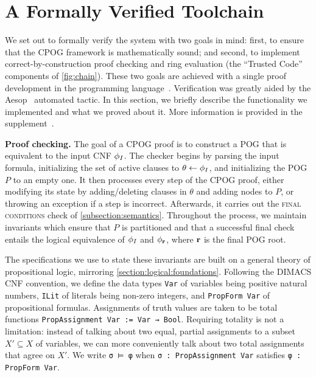 \section{A Formally Verified Toolchain}
\label{section:formally-verified-toolchain}

We set out to formally verify the system with two goals in mind: first, to ensure that the CPOG framework is mathematically
sound; and second, to implement correct-by-construction proof checking and ring evaluation (the ``Trusted Code'' components of \cref{fig:chain}). These two goals are achieved with a single proof development in the \lean{} programming language~\cite{demoura:cade:2021}. Verification was greatly aided by the Aesop~\cite{23limperg_aesop_white_box_best_first_proof_search_lean} automated tactic. In this section, we briefly describe the functionality we implemented and what we proved about it. More information is provided in the supplement~\cite{bryant:sat:2023:supplement}.

\vspace{1em}\noindent
\textbf{Proof checking.} The goal of a CPOG proof is to construct a POG that is equivalent to the input CNF $\phi_I$. The checker begins by parsing the input formula, initializing the set of active clauses to $\theta \leftarrow \phi_I$, and initializing the POG $P$ to an empty one. It then processes every step of the CPOG proof, either modifying its state by adding/deleting clauses in $\theta$ and adding nodes to $P$, or throwing an exception if a step is incorrect. Afterwards, it carries out the \textsc{final conditions} check of \cref{subsection:semantics}. Throughout the process, we maintain invariants which ensure that $P$ is partitioned and that a successful final check entails the logical equivalence of $\phi_I$ and $\phi_{\mathbf{r}}$, where $\mathbf{r}$ is the final POG root.

The specifications we use to state these invariants are built on a general theory of propositional logic, mirroring \cref{section:logical:foundations}. Following the DIMACS CNF convention, we define the data types \lstinline{Var} of variables being positive natural numbers, \lstinline{ILit} of literals being non-zero integers, and \lstinline{PropForm Var} of propositional formulas. Assignments of truth values are taken to be total functions \lstinline{PropAssignment Var := Var → Bool}. Requiring totality is not a limitation: instead of talking about two equal, partial assignments to a subset $X' \subseteq X$ of variables, we can more conveniently talk about two total assignments that agree on $X'$. We write \lstinline{σ ⊨ φ} when \lstinline{σ : PropAssignment Var} satisfies \lstinline{φ : PropForm Var}.

